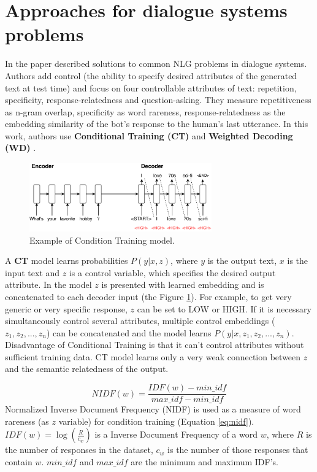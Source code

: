\section{Approaches for dialogue systems problems}\label{usual_problems}
In the paper \cite{see2019makes} described solutions to common NLG problems in dialogue systems. Authors add control (the ability to specify desired attributes of the generated text at test time) and focus on four controllable attributes of text: repetition, specificity, response-relatedness and question-asking. They measure repetitiveness as n-gram overlap, specificity as word rareness, response-relatedness as the embedding similarity of the bot’s response to the human’s last utterance. In this work, authors use \textbf{Conditional Training (CT)} \cite{peng2018towards} and \textbf{Weighted Decoding (WD)} \cite{ghazvininejad2017hafez}. 

\begin{figure}[hbt]
  \centering
  \includegraphics[width=0.7\textwidth]{figures/ct.pdf}
  \caption{Example of Condition Training model.}
  \label{ct}
\end{figure}


A \textbf{CT} model learns probabilities $P(y|x,z)$, where $y$ is the output text, $x$ is the input text and $z$ is a control variable, which specifies the desired output attribute. In the model $z$ is presented with learned embedding and is concatenated to each decoder input (the Figure \ref{ct}). For example, to get very generic or very specific response, $z$ can be set to LOW or HIGH. If it is necessary simultaneously control several attributes, multiple control embeddings ($z_1, z_2, ..., z_n$) can be concatenated and the model learns $P(y|x, z_1, z_2, ..., z_n)$. Disadvantage of Conditional Training is that it can’t control attributes without sufficient training data. CT model learns only a very weak connection between $z$ and the semantic relatedness of the output.

\begin{equation} \label{eq:nidf}
NIDF(w) = \frac{IDF(w) - min\_idf}{max\_idf - min\_idf}
\end{equation}
Normalized Inverse Document Frequency (NIDF) is used as a measure of word rareness (as $z$ variable) for condition training (Equation \ref{eq:nidf}). $IDF(w) = \log(\frac{R}{c_w})$ is a Inverse Document Frequency of a word $w$, where $R$ is the number of responses in the dataset, $c_w$ is the number of those responses that contain $w$. $min\_idf$ and $max\_idf$ are the minimum and maximum IDF's.

